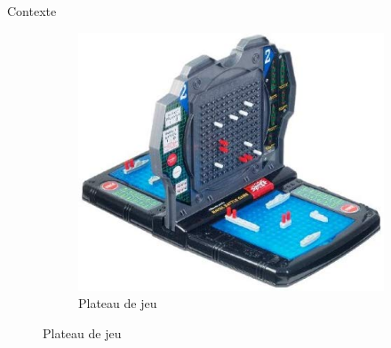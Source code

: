 \begin{frame}{Contexte}
\begin{figure}
\begin{subfigure}{.56\textwidth}
                \includegraphics[width=.9\linewidth]{images/plateau.jpg} %
                 \caption*{Plateau de jeu}
                \label{fig:plateaujeu}
            \end{subfigure}
        \end{figure}
	\end{frame}
	
